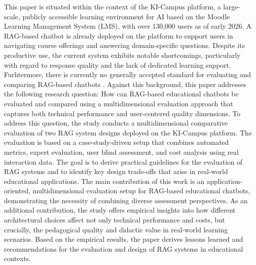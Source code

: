 This paper is situated within the context of the KI-Campus platform, a large-scale, publicly accessible learning environment for AI based on the Moodle Learning Management System (LMS), with over 130,000 users as of early 2026. A RAG-based chatbot is already deployed on the platform to support users in navigating course offerings and answering domain-specific questions. Despite its productive use, the current system exhibits notable shortcomings, particularly with regard to response quality and the lack of dedicated learning support. Furhtermore, there is currently no generally accepted standard for evaluating and comparing RAG-based chatbots \autocite{Yu2024RAGEvalSurvey,Swacha2025}. Against this background, this paper addresses the following research question: How can RAG-based educational chatbots be evaluated and compared using a multidimensional evaluation approach that captures both technical performance and user-centered quality dimensions. To address this question, the study conducts a multidimensional comparative evaluation of two RAG system designs deployed on the KI-Campus platform. The evaluation is based on a case-study-driven setup that combines automated metrics, expert evaluation, user blind assessment, and cost analysis using real interaction data. The goal is to derive practical guidelines for the evaluation of RAG systems and to identify key design trade-offs that arise in real-world educational applications. The main contribution of this work is an application-oriented, multidimensional evaluation setup for RAG-based educational chatbots, demonstrating the necessity of combining diverse assessment perspectives. As an additional contribution, the study offers empirical insights into how different architectural choices affect not only technical performance and costs, but crucially, the pedagogical quality and didactic value in real-world learning scenarios. Based on the empirical results, the paper derives lessons learned and recommendations for the evaluation and design of RAG systems in educational contexts.
